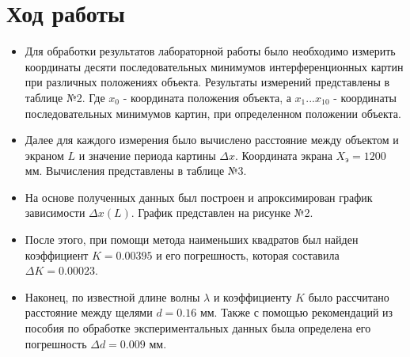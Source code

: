 \documentclass{article}
\begin{document}
\section{Ход работы}
\begin{itemize}
  \item Для обработки результатов лабораторной работы было необходимо измерить координаты десяти последовательных минимумов интерференционных картин при различных положениях объекта. Результаты измерений представлены в таблице №2. Где $x_{0}$ - координата положения объекта, а $x_{1}...x_{10}$ - координаты последовательных минимумов картин, при определенном положении объекта.
  \item Далее для каждого измерения было вычислено расстояние между объектом и экраном $L$ и значение периода картины $\Delta x$. Координата экрана $X_{\textbf{э}}=1200$ мм. Вычисления представлены в таблице №3.
  \item На основе полученных данных был построен и апроксимирован график зависимости $ \Delta x(L) $. График представлен на рисунке №2.
  \item После этого, при помощи метода наименьших квадратов был найден коэффициент $K = 0.00395$ и его погрешность, которая составила $ \Delta K = 0.00023 $.
  \item Наконец, по известной длине волны $\lambda$ и коэффициенту $ K $ было рассчитано расстояние между щелями $d = 0.16$ мм. Также с помощью рекомендаций из пособия по обработке экспериментальных данных была определена его погрешность $\Delta d = 0.009$ мм.
\end{itemize}
\end{document}
